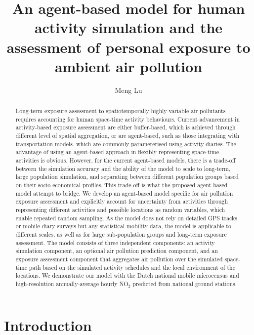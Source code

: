 \documentclass[]{article}
\author{Meng Lu }
\title{An agent-based model for human activity simulation and the assessment of personal exposure to ambient air pollution}
\begin{document}
\maketitle
\begin{abstract}
 
 Long-term exposure assessment to spatiotemporally highly variable air pollutants requires accounting for human space-time activity behaviours. Current advancement in activity-based exposure assessment are either buffer-based, which is achieved through different level of spatial aggregation, or are agent-based, such as those integrating with transportation models. which are commonly parameterised using activity diaries. The advantage of using an agent-based approach in flexibly representing space-time activities is obvious. However, for the current agent-based models, there is a trade-off between the simulation accuracy and the ability of the model to scale to long-term, large population simulation, and separating between different population groups based on their socio-economical profiles. This trade-off is what the proposed agent-based model attempt to bridge. We develop an agent-based model specific for air pollution exposure assessment and explicitly account for uncertainty from activities through representing different activities and possible locations as random variables, which enable repeated random sampling. As the model does not rely on detailed GPS tracks or mobile diary surveys but any statistical mobility data, the model is applicable to different scales, as well as for large sub-population groups and long-term exposure assessment. The model consists of three independent components: an activity simulation component, an optional air pollution prediction component, and an exposure assessment component that aggregates air pollution over the simulated space-time path based on the simulated activity schedules and the local environment of the locations. We demonstrate our model with the Dutch national mobile microcensus and high-resolution annually-average hourly NO$_2$ predicted from national ground stations. 

\end{abstract}

 
\section{Introduction}
\end{document}
